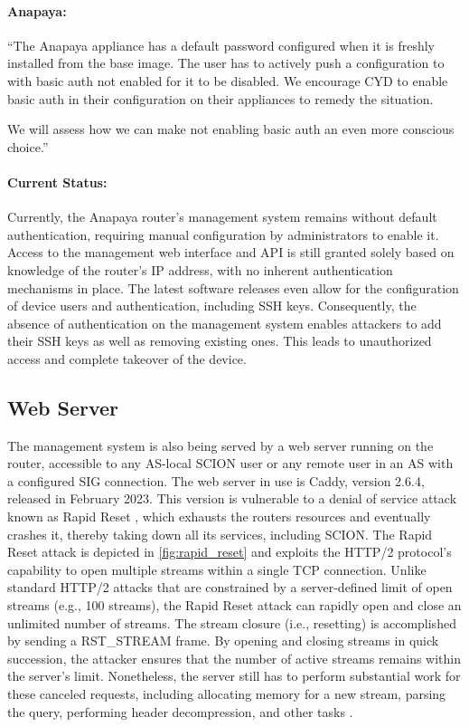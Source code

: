 \begin{boxH}
\paragraph{Anapaya:}
``The Anapaya appliance has a default password configured when it is freshly installed from the base image. The user has to actively push a configuration to with basic auth not enabled for it to be disabled.
We encourage CYD to enable basic auth in their configuration on their appliances to remedy the situation.

We will assess how we can make not enabling basic auth an even more conscious choice.''
\end{boxH}

\paragraph{Current Status:}
Currently, the Anapaya router's management system remains without default authentication, requiring manual configuration by administrators to enable it.
Access to the management web interface and API is still granted solely based on knowledge of the router's IP address, with no inherent authentication mechanisms in place.
The latest software releases even allow for the configuration of device users and authentication, including SSH keys.
Consequently, the absence of authentication on the management system enables attackers to add their SSH keys as well as removing existing ones.
This leads to unauthorized access and complete takeover of the device.


\subsection{Web Server}
\label{sec:web-server}
The management system is also being served by a web server running on the router, accessible to any AS-local SCION user or any remote user in an AS with a configured SIG connection.
The web server in use is Caddy, version 2.6.4, released in February 2023.
This version is vulnerable to a denial of service attack known as Rapid Reset \cite{googleWorksNovel}, which exhausts the routers resources and eventually crashes it, thereby taking down all its services, including SCION.
The Rapid Reset attack is depicted in \cref{fig:rapid_reset} and exploits the HTTP/2 protocol's capability to open multiple streams within a single TCP connection.
Unlike standard HTTP/2 attacks that are constrained by a server-defined limit of open streams (e.g., 100 streams), the Rapid Reset attack can rapidly open and close an unlimited number of streams.
The stream closure (i.e., resetting) is accomplished by sending a RST\_STREAM frame.
By opening and closing streams in quick succession, the attacker ensures that the number of active streams remains within the server's limit.
Nonetheless, the server still has to perform substantial work for these canceled requests, including allocating memory for a new stream, parsing the query, performing header decompression, and other tasks \cite{googleWorksNovel}.

